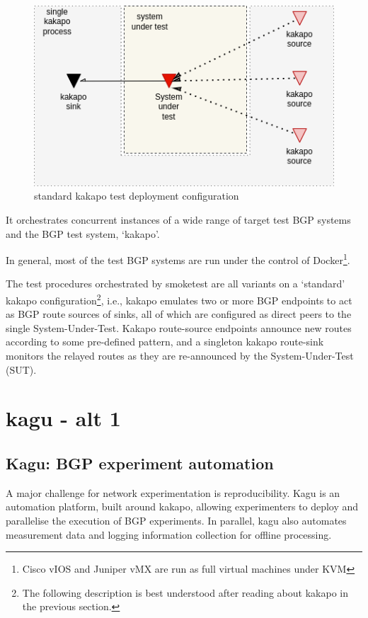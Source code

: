 \begin{figure}[H]
    \centering
    \includegraphics[width=0.7\linewidth]{images/bgp6.drawio.png}
    \caption{standard kakapo test deployment configuration}
    \label{fig:diag6}
\end{figure}

It orchestrates concurrent instances of a wide range of target test BGP systems and the BGP test system, `kakapo'.

In general, most of the test BGP systems are run under the control of Docker\footnote{Cisco vIOS and Juniper vMX are run as full virtual machines under KVM}.

The test procedures orchestrated by smoketest are all variants on a `standard' kakapo configuration\footnote{The following description is best understood after reading about kakapo in the previous section.}, i.e., kakapo emulates two or more BGP endpoints to act as BGP route sources of sinks, all of which are configured as direct peers to the single System-Under-Test.
Kakapo route-source endpoints announce new routes according to some pre-defined pattern, and a singleton kakapo route-sink monitors the relayed routes as they are re-announced by the System-Under-Test (SUT).


\section{kagu - alt 1}


\subsection{Kagu: BGP experiment automation}

A major challenge for network experimentation is reproducibility. Kagu is an
automation platform, built around kakapo, allowing experimenters to deploy and
parallelise the execution of BGP experiments. In parallel, kagu also automates
measurement data and logging information collection for offline processing.

